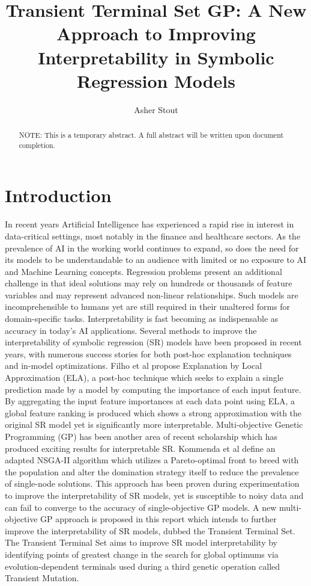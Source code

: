 \documentclass[a4paper, twocolumn]{article}
\title{Transient Terminal Set GP: A New Approach to Improving Interpretability in Symbolic Regression Models}
\author{Asher Stout}
\begin{document}
\maketitle
\begin{abstract}
NOTE: This is a temporary abstract. A full abstract will be written upon document completion.
\end{abstract}

\section{Introduction}
In recent years Artificial Intelligence has experienced a rapid rise in interest in data-critical settings, most notably in the finance and healthcare sectors. As the prevalence of AI in the working world continues to expand, so does the need for its models to be understandable to an audience with limited or no exposure to AI and Machine Learning concepts. Regression problems present an additional challenge in that ideal solutions may rely on hundreds or thousands of feature variables and may represent advanced non-linear relationships. Such models are incomprehensible to humans yet are still required in their unaltered forms for domain-specific tasks. Interpretability is fast becoming as indispensable as accuracy in today's AI applications.
\newline
Several methods to improve the interpretability of symbolic regression (SR) models have been proposed in recent years, with numerous success stories for both post-hoc explanation techniques and in-model optimizations. Filho et al propose Explanation by Local Approximation (ELA), a post-hoc technique which seeks to explain a single prediction made by a model by computing the importance of each input feature. By aggregating the input feature importances at each data point using ELA, a global feature ranking is produced which shows a strong approximation with the original SR model yet is significantly more interpretable.
\newline
Multi-objective Genetic Programming (GP) has been another area of recent scholarship which has produced exciting results for interpretable SR. Kommenda et al define an adapted NSGA-II algorithm which utilizes a Pareto-optimal front to breed with the population and alter the domination strategy itself to reduce the prevalence of single-node solutions. This approach has been proven during experimentation to improve the interpretability of SR models, yet is susceptible to noisy data and can fail to converge to the accuracy of single-objective GP models.
\newline
A new multi-objective GP approach is proposed in this report which intends to further improve the interpretability of SR models, dubbed the Transient Terminal Set. The Transient Terminal Set aims to improve SR model interpretability by identifying points of greatest change in the search for global optimums via evolution-dependent terminals used during a third genetic operation called Transient Mutation.
\end{document}
